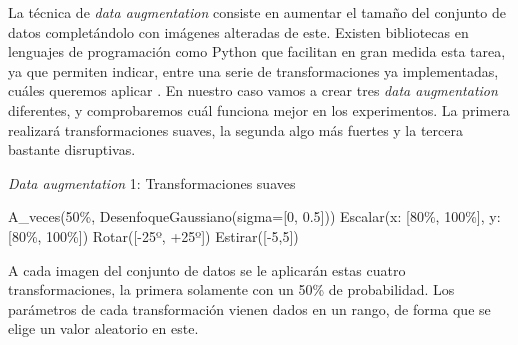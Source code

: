 La técnica de \textit{data augmentation} consiste en aumentar el tamaño del conjunto de datos completándolo con imágenes alteradas de este. Existen bibliotecas en lenguajes de programación como Python que facilitan en gran medida esta tarea, ya que permiten indicar, entre una serie de transformaciones ya implementadas, cuáles queremos aplicar \cite{imgaug}. En nuestro caso vamos a crear tres \textit{data augmentation} diferentes, y comprobaremos cuál funciona mejor en los experimentos. La primera realizará transformaciones suaves, la segunda algo más fuertes y la tercera bastante disruptivas.

\begin{algorithm}[H]
    \caption{\textit{Data augmentation} 1: Transformaciones suaves}
\begin{algorithmic}[1]
    \State A\_veces(50\%, DesenfoqueGaussiano(sigma=[0, 0.5]))
    \State Escalar(x: [80\%, 100\%], y: [80\%, 100\%])
    \State Rotar([-25º, +25º])
    \State Estirar([-5,5])
\end{algorithmic}
\end{algorithm}

A cada imagen del conjunto de datos se le aplicarán estas cuatro transformaciones, la primera solamente con un 50\% de probabilidad. Los parámetros de cada transformación vienen dados en un rango, de forma que se elige un valor aleatorio en este.





